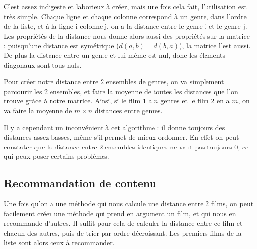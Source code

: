 \documentclass[11pt,a4paper]{report}
\begin{document}
\normalsize
C'est assez indigeste et laborieux à créer, mais une fois cela fait, l'utilisation est très simple. Chaque ligne et chaque colonne correspond à un genre, dans l'ordre de la liste, et à la ligne i colonne j, on a la distance entre le genre i et le genre j. Les propriétés de la distance nous donne alors aussi des propriétés sur la matrice : puisqu'une distance est symétrique (\(d(a,b)=d(b,a)\)), la matrice l'est aussi. De plus la distance entre un genre et lui même est nul, donc les éléments diagonaux sont tous nuls.\par
Pour créer notre distance entre 2 ensembles de genres, on va simplement parcourir les 2 ensembles, et faire la moyenne de toutes les distances que l'on trouve grâce à notre matrice. Ainsi, si le film 1 a $n$ genres et le film 2 en a $m$, on va faire la moyenne de $m\times n$ distances entre genres.\par
Il y a cependant un inconvénient à cet algorithme : il donne toujours des distances assez basses, même s'il permet de mieux ordonner. En effet on peut constater que la distance entre 2 ensembles identiques ne vaut pas toujours 0, ce qui peux poser certains problèmes.

\subsection{Recommandation de contenu}

Une fois qu'on a une méthode qui nous calcule une distance entre 2 films, on peut facilement créer une méthode qui prend en argument un film, et qui nous en recommande d'autres. Il suffit pour cela de calculer la distance entre ce film et chacun des autres, puis de trier par ordre décroissant. Les premiers films de la liste sont alors ceux à recommander.





















\end{document}
